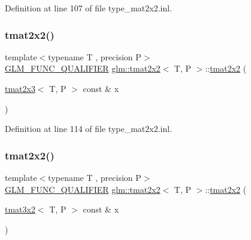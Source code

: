 Definition at line 107 of file type\+\_\+mat2x2.\+inl.

\mbox{\label{structglm_1_1tmat2x2_ac50ef056ce996b1af6066382eeb49a4f}} 
\subsubsection{\texorpdfstring{tmat2x2()}{tmat2x2()}\hspace{0.1cm}{\footnotesize\ttfamily [13/22]}}
{\footnotesize\ttfamily template$<$typename T , precision P$>$ \\
\mbox{\hyperlink{setup_8hpp_a33fdea6f91c5f834105f7415e2a64407}{G\+L\+M\+\_\+\+F\+U\+N\+C\+\_\+\+Q\+U\+A\+L\+I\+F\+I\+ER}} \mbox{\hyperlink{structglm_1_1tmat2x2}{glm\+::tmat2x2}}$<$ T, P $>$\+::\mbox{\hyperlink{structglm_1_1tmat2x2}{tmat2x2}} (\begin{DoxyParamCaption}\item[{\mbox{\hyperlink{structglm_1_1tmat2x3}{tmat2x3}}$<$ T, P $>$ const \&}]{x }\end{DoxyParamCaption})}



Definition at line 114 of file type\+\_\+mat2x2.\+inl.

\mbox{\label{structglm_1_1tmat2x2_a06366377c97a00ee72ba66718ab92751}} 
\subsubsection{\texorpdfstring{tmat2x2()}{tmat2x2()}\hspace{0.1cm}{\footnotesize\ttfamily [14/22]}}
{\footnotesize\ttfamily template$<$typename T , precision P$>$ \\
\mbox{\hyperlink{setup_8hpp_a33fdea6f91c5f834105f7415e2a64407}{G\+L\+M\+\_\+\+F\+U\+N\+C\+\_\+\+Q\+U\+A\+L\+I\+F\+I\+ER}} \mbox{\hyperlink{structglm_1_1tmat2x2}{glm\+::tmat2x2}}$<$ T, P $>$\+::\mbox{\hyperlink{structglm_1_1tmat2x2}{tmat2x2}} (\begin{DoxyParamCaption}\item[{\mbox{\hyperlink{structglm_1_1tmat3x2}{tmat3x2}}$<$ T, P $>$ const \&}]{x }\end{DoxyParamCaption})}



